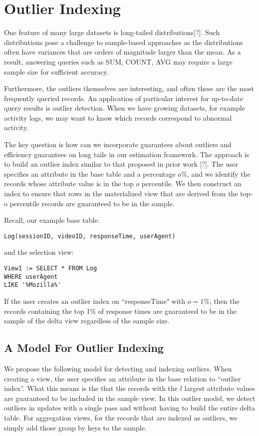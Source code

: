 \section{Outlier Indexing}
One feature of many large datasets is long-tailed distributions[?].
Such distributions pose a challenge to sample-based approaches as the
distributions often have variances that are orders of magnitude larger
than the mean.
As a result, answering queries such as SUM, COUNT, AVG may require a large 
sample size for sufficient accuracy.

Furthermore, the outliers themselves are interesting, and often these are the
most frequently queried records.
An application of particular interest for up-to-date query results
is outlier detection. When we have growing datasets, for example activity
logs, we may want to know which records correspond to abnormal activity.

The key question is how can we incorporate guarantees about outliers
and efficiency guarantees on long tails in our estimation framework.
The approach is to build an outlier index similar to that proposed in prior work [?].
The user specifies an attribute in the base table and a percentage $o\%$, and we 
identify the records whose attribute value is in the top $o$ percentile.
We then construct an index to ensure that rows in the materialized view
that are derived from the top-o percentile records are guaranteed to be in the sample.

Recall, our example base table:
\begin{lstlisting}
Log(sessionID, videoID, responseTime, userAgent)
\end{lstlisting}
and the selection view:
\begin{lstlisting}
View1 := SELECT * FROM Log 
WHERE userAgent 
LIKE '%Mozilla%'
\end{lstlisting}
If the user creates an outlier index on ``responseTime" with $o=1\%$, then
the records containing the top 1\% of response times are guaranteed to be 
in the sample of the delta view regardless of the sample size.

\subsection{A Model For Outlier Indexing}

We propose the following model for detecting and indexing outliers.
When creating a view, the user specifies an attribute in the base
relation to ``outlier index''. What this means is the that the records
with the $l$ largest attribute values are guaranteed to be included
in the sample view. In this outlier model, we detect outliers in updates
with a single pass and without having to build the entire delta table.
For aggregation views, for the records that are indexed as outliers,
we simply add those group by keys to the sample.


